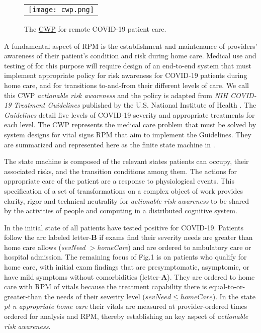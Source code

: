 \begin{figure}[t]
  \begin{center}
    \begin{tabular}{c}
      \texttt{[image: cwp.png]}
    \end{tabular}
  \end{center}
\caption{The \href{https://github.com/ericmercer/SPIN-bpmn-cwp-verification-paper/blob/main/26-Oct-2021-CWP.png}{CWP} for remote COVID-19 patient care.}
\label{fig:cwp}
\end{figure}

A fundamental aspect of RPM is the establishment and maintenance of providers' awareness of their patient’s condition and risk during home care.
Medical use and testing of \phware for this purpose will require design of an end-to-end system that must implement appropriate policy for risk awareness for COVID-19 patients during home care, and for transitions to-and-from their different levels of care.
We call this CWP \emph{actionable risk awareness} and the policy is adapted from \emph{NIH COVID-19 Treatment Guidelines} published by the U.S. National Institute of Health \cite{NIH}.
The \emph{Guidelines} detail five levels of COVID-19 severity and appropriate treatments for each level.
The CWP represents the medical care problem that must be solved by system designs for vital signs RPM that aim to implement the Guidelines.
They are summarized and represented here as the finite state machine in .

The state machine is composed of the relevant states patients can occupy, their associated risks, and the transition conditions among them. The actions for appropriate care of the patient are a response to physiological events. This specification of a set of transformations on a complex object of work provides clarity, rigor and technical neutrality for \emph{actionable risk awareness} to be shared by the activities of people and computing in a distributed cognitive system.

In the initial state of  all patients have tested positive for COVID-19. Patients follow the arc labeled letter-\textbf{B} if exams find their severity needs are greater than home care allows (\emph{sevNeed $>$homeCare}) and are ordered to ambulatory care or hospital admission.
The remaining focus of Fig.1 is on patients who qualify for home care, with initial exam findings that are presymptomatic, asymptomic, or have mild symptoms without comorbidities (letter-\textbf{A}).
They are ordered to home care with RPM of vitals because the treatment capability there is equal-to-or-greater-than the needs of their severity level (\emph{$sevNeed \le homeCare$}).
In the state \emph{pt n appropriate home care} their vitals are measured at provider-ordered times ordered for analysis and RPM, thereby establishing an key aspect of \emph{actionable risk awareness}.

